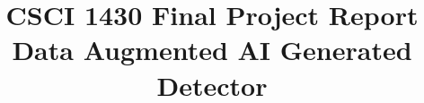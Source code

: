 %
%
%

%
%
%
%
% 
%
%
% 

\documentclass[10pt,twocolumn,letterpaper]{article}
 
\usepackage{cvpr}
\usepackage{times}
\usepackage{epsfig}
\usepackage{graphicx}
\usepackage{amsmath}
\usepackage{amssymb}
\usepackage{booktabs}
\usepackage{microtype}
\usepackage[numbered,framed]{matlab-prettifier}

\frenchspacing


\usepackage[pagebackref=true,breaklinks=true,letterpaper=true,colorlinks,bookmarks=false]{hyperref}

\cvprfinalcopy
\def\cvprPaperID{****}
\def\httilde{\mbox{\tt\raisebox{-.5ex}{\symbol{126}}}}
\ifcvprfinal\pagestyle{empty}\fi



\title{CSCI 1430 Final Project Report\\Data Augmented AI Generated Detector}

